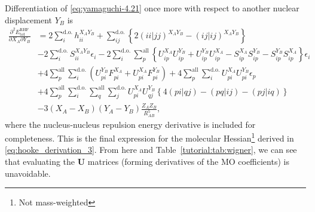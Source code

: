 \documentclass[%
class = book,%
crop = false,%
float = true,%
multi = true,%
preview = false,%
]{standalone}
\begin{document}
Differentiation of \eqref{eq:yamaguchi-4.21} once more with respect to another nuclear displacement \(Y_{B}\) is
\begin{equation}
  \label{eq:yamaguchi-4.54-and-4.55-and-3.127}\tag{Yamaguchi eqs. 4.54, 4.55, 3.127}
  \begin{aligned}
    \frac{\partial^{2} E_{\text{tot}}^{\text{RHF}}}{\partial X_{A} \partial Y_{B}} &= 2 \sum_{i}^{\text{d.o.}} h_{ii}^{X_{A}Y_{B}} + \sum_{ij}^{\text{d.o.}} \left\{ 2(ii|jj)^{X_{A}Y_{B}} - (ij|ij)^{X_{A}Y_{B}} \right\} \\
    &- 2 \sum_{i}^{\text{d.o.}} S_{ii}^{X_{A}Y_{B}} \epsilon_{i} - 2 \sum_{i}^{\text{d.o.}} \sum_{p}^{\text{all}} \left\{ U_{ip}^{X_{A}}U_{ip}^{Y_{B}} + U_{ip}^{Y_{B}}U_{ip}^{X_{A}} - S_{ip}^{X_{A}}S_{ip}^{Y_{B}} - S_{ip}^{Y_{B}}S_{ip}^{X_{A}} \right\} \epsilon_{i} \\
    &+ 4 \sum_{p}^{\text{all}} \sum_{i}^{\text{d.o.}} \left( U_{pi}^{Y_{B}} F_{pi}^{X_{A}} + U_{pi}^{X_{A}} F_{pi}^{Y_{B}} \right) + 4 \sum_{p}^{\text{all}} \sum_{i}^{\text{d.o.}} U_{pi}^{X_{A}} U_{pi}^{Y_{B}} \epsilon_{p} \\
    &+ 4 \sum_{p}^{\text{all}} \sum_{i}^{\text{d.o.}} \sum_{q}^{\text{all}} \sum_{j}^{\text{d.o.}} U_{pi}^{X_{A}} U_{qj}^{Y_{B}} \left\{ 4(pi|qj) - (pq|ij) - (pj|iq) \right\} \\
    &- 3\left(X_{A}-X_{B}\right)\left(Y_{A}-Y_{B}\right)\frac{Z_{A}Z_{B}}{R_{AB}^{5}},
  \end{aligned}
\end{equation}
where the nucleus-nucleus repulsion energy derivative is included for completeness. This is the final expression for the molecular Hessian\footnote{Not mass-weighted} derived in \eqref{eq:hooke_derivation_3}. From here and Table~\ref{tutorial:tab:wigner}, we can see that evaluating the \(\mathbf{U}\) matrices (forming derivatives of the MO coefficients) is unavoidable.
\end{document}
